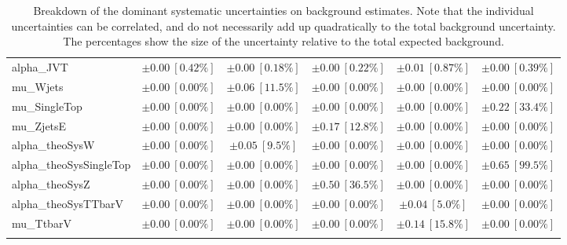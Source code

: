 \begin{sidewaystable}
\begin{center}
\begin{tabular*}{\textwidth}{@{\extracolsep{\fill}}lccccc}
alpha\_JVT         & $\pm 0.00\ [0.42\%] $          & $\pm 0.00\ [0.18\%] $          & $\pm 0.00\ [0.22\%] $          & $\pm 0.01\ [0.87\%] $          & $\pm 0.00\ [0.39\%] $       \\
mu\_Wjets         & $\pm 0.00\ [0.00\%] $          & $\pm 0.06\ [11.5\%] $          & $\pm 0.00\ [0.00\%] $          & $\pm 0.00\ [0.00\%] $          & $\pm 0.00\ [0.00\%] $       \\
mu\_SingleTop         & $\pm 0.00\ [0.00\%] $          & $\pm 0.00\ [0.00\%] $          & $\pm 0.00\ [0.00\%] $          & $\pm 0.00\ [0.00\%] $          & $\pm 0.22\ [33.4\%] $       \\
mu\_ZjetsE         & $\pm 0.00\ [0.00\%] $          & $\pm 0.00\ [0.00\%] $          & $\pm 0.17\ [12.8\%] $          & $\pm 0.00\ [0.00\%] $          & $\pm 0.00\ [0.00\%] $       \\
alpha\_theoSysW         & $\pm 0.00\ [0.00\%] $          & $\pm 0.05\ [9.5\%] $          & $\pm 0.00\ [0.00\%] $          & $\pm 0.00\ [0.00\%] $          & $\pm 0.00\ [0.00\%] $       \\
alpha\_theoSysSingleTop         & $\pm 0.00\ [0.00\%] $          & $\pm 0.00\ [0.00\%] $          & $\pm 0.00\ [0.00\%] $          & $\pm 0.00\ [0.00\%] $          & $\pm 0.65\ [99.5\%] $       \\
alpha\_theoSysZ         & $\pm 0.00\ [0.00\%] $          & $\pm 0.00\ [0.00\%] $          & $\pm 0.50\ [36.5\%] $          & $\pm 0.00\ [0.00\%] $          & $\pm 0.00\ [0.00\%] $       \\
alpha\_theoSysTTbarV         & $\pm 0.00\ [0.00\%] $          & $\pm 0.00\ [0.00\%] $          & $\pm 0.00\ [0.00\%] $          & $\pm 0.04\ [5.0\%] $          & $\pm 0.00\ [0.00\%] $       \\
mu\_TtbarV         & $\pm 0.00\ [0.00\%] $          & $\pm 0.00\ [0.00\%] $          & $\pm 0.00\ [0.00\%] $          & $\pm 0.14\ [15.8\%] $          & $\pm 0.00\ [0.00\%] $       \\
\noalign{\smallskip}\hline\noalign{\smallskip}
\end{tabular*}
\end{center}
\caption[Breakdown of uncertainty on background estimates]{
Breakdown of the dominant systematic uncertainties on background estimates.
Note that the individual uncertainties can be correlated, and do not necessarily add up quadratically to 
the total background uncertainty. The percentages show the size of the uncertainty relative to the total expected background.
\label{table.results.bkgestimate.uncertainties.SRE_bybkg}}
\end{sidewaystable}
%
